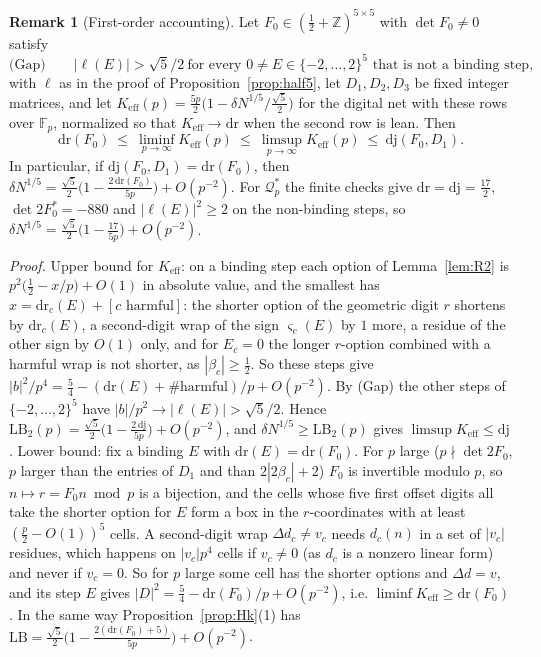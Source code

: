 \documentclass[11pt]{amsart}
\theoremstyle{definition}
\newtheorem{remark}[theorem]{Remark}
\theoremstyle{plain}
\newcommand{\Z}{\mathbb{Z}}
\newcommand{\F}{\mathbb{F}}
\begin{document}
\begin{remark}[First-order accounting]\label{rem:accounting}
Let $F_0\in(\frac12+\Z)^{5\times5}$ with $\det F_0\ne0$ satisfy
\[
\text{(Gap)}\qquad |\ell(E)|>\sqrt5/2\ \text{for every } 0\ne E\in\{-2,\dots,2\}^5 \text{ that is not a binding step},
\]
with $\ell$ as in the proof of Proposition~\ref{prop:half5}, let $D_1,D_2,D_3$ be fixed integer matrices, and let $K_{\mathrm{eff}}(p)=\frac{5p}2\bigl(1-\delta N^{1/5}/\frac{\sqrt5}2\bigr)$ for the digital net with these rows over $\F_p$, normalized so that $K_{\mathrm{eff}}\to\mathrm{dr}$ when the second row is lean. Then
\[
\mathrm{dr}(F_0)\ \le\ \liminf_{p\to\infty}K_{\mathrm{eff}}(p)\ \le\ \limsup_{p\to\infty}K_{\mathrm{eff}}(p)\ \le\ \mathrm{dj}(F_0,D_1).
\]
In particular, if $\mathrm{dj}(F_0,D_1)=\mathrm{dr}(F_0)$, then $\delta N^{1/5}=\frac{\sqrt5}2\bigl(1-\frac{2\,\mathrm{dr}(F_0)}{5p}\bigr)+O(p^{-2})$. For $\mathcal Q^*_p$ the finite checks give $\mathrm{dr}=\mathrm{dj}=\frac{17}2$, $\det2F_0^*=-880$ and $|\ell(E)|^2\ge2$ on the non-binding steps, so $\delta N^{1/5}=\frac{\sqrt5}2\bigl(1-\frac{17}{5p}\bigr)+O(p^{-2})$.

\emph{Proof.} Upper bound for $K_{\mathrm{eff}}$: on a binding step each option of Lemma~\ref{lem:R2} is $p^2\bigl(\frac12-x/p\bigr)+O(1)$ in absolute value, and the smallest has $x=\mathrm{dr}_c(E)+[c\text{ harmful}]$: the shorter option of the geometric digit $r$ shortens by $\mathrm{dr}_c(E)$, a second-digit wrap of the sign $\varsigma_c(E)$ by $1$ more, a residue of the other sign by $O(1)$ only, and for $E_c=0$ the longer $r$-option combined with a harmful wrap is not shorter, as $|\beta_c|\ge\frac12$. So these steps give $|b|^2/p^4=\frac54-(\mathrm{dr}(E)+\#\text{harmful})/p+O(p^{-2})$. By (Gap) the other steps of $\{-2,\dots,2\}^5$ have $|b|/p^2\to|\ell(E)|>\sqrt5/2$. Hence $\mathrm{LB}_2(p)=\frac{\sqrt5}2\bigl(1-\frac{2\,\mathrm{dj}}{5p}\bigr)+O(p^{-2})$, and $\delta N^{1/5}\ge\mathrm{LB}_2(p)$ gives $\limsup K_{\mathrm{eff}}\le\mathrm{dj}$. Lower bound: fix a binding $E$ with $\mathrm{dr}(E)=\mathrm{dr}(F_0)$. For $p$ large ($p\nmid\det2F_0$, $p$ larger than the entries of $D_1$ and than $2|2\beta_c|+2$) $F_0$ is invertible modulo $p$, so $n\mapsto r=F_0n\bmod p$ is a bijection, and the cells whose five first offset digits all take the shorter option for $E$ form a box in the $r$-coordinates with at least $(\frac p2-O(1))^5$ cells. A second-digit wrap $\Delta d_c\ne v_c$ needs $d_c(n)$ in a set of $|v_c|$ residues, which happens on $|v_c|p^4$ cells if $v_c\ne0$ (as $d_c$ is a nonzero linear form) and never if $v_c=0$. So for $p$ large some cell has the shorter options and $\Delta d=v$, and its step $E$ gives $|D|^2=\frac54-\mathrm{dr}(F_0)/p+O(p^{-2})$, i.e. $\liminf K_{\mathrm{eff}}\ge\mathrm{dr}(F_0)$. In the same way Proposition~\ref{prop:Hk}(1) has $\mathrm{LB}=\frac{\sqrt5}2\bigl(1-\frac{2(\mathrm{dr}(F_0)+5)}{5p}\bigr)+O(p^{-2})$.


\end{remark}
\end{document}
